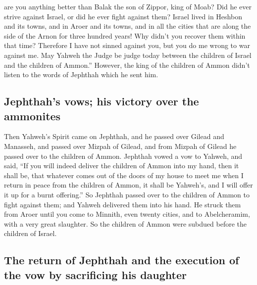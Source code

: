 \begin{paracol}{2}
\begin{otherlanguage}{english}
are you anything better than Balak the son of Zippor, king of Moab? Did
he ever strive against Israel, or did he ever fight against them?
 Israel lived in Heshbon and its towns, and in Aroer and
its towns, and in all the cities that are along the side of the Arnon
for three hundred years! Why didn't you recover them within that time?
 Therefore I have not sinned against you, but you do me
wrong to war against me. May Yahweh the Judge be judge today between the
children of Israel and the children of Ammon.''  However,
the king of the children of Ammon didn't listen to the words of Jephthah
which he sent him.

\hypertarget{jephthahs-vows-his-victory-over-the-ammonites}{%
\subsection{Jephthah's vows; his victory over the
ammonites}\label{jephthahs-vows-his-victory-over-the-ammonites}}

 Then Yahweh's Spirit came on Jephthah, and he passed
over Gilead and Manasseh, and passed over Mizpah of Gilead, and from
Mizpah of Gilead he passed over to the children of Ammon.
 Jephthah vowed a vow to Yahweh, and said, ``If you will
indeed deliver the children of Ammon into my hand,  then
it shall be, that whatever comes out of the doors of my house to meet me
when I return in peace from the children of Ammon, it shall be Yahweh's,
and I will offer it up for a burnt offering.''  So
Jephthah passed over to the children of Ammon to fight against them; and
Yahweh delivered them into his hand.  He struck them from
Aroer until you come to Minnith, even twenty cities, and to
Abelcheramim, with a very great slaughter. So the children of Ammon were
subdued before the children of Israel.

\hypertarget{the-return-of-jephthah-and-the-execution-of-the-vow-by-sacrificing-his-daughter}{%
\subsection{The return of Jephthah and the execution of the vow by
sacrificing his
daughter}\label{the-return-of-jephthah-and-the-execution-of-the-vow-by-sacrificing-his-daughter}}


\end{otherlanguage}
\end{paracol}
